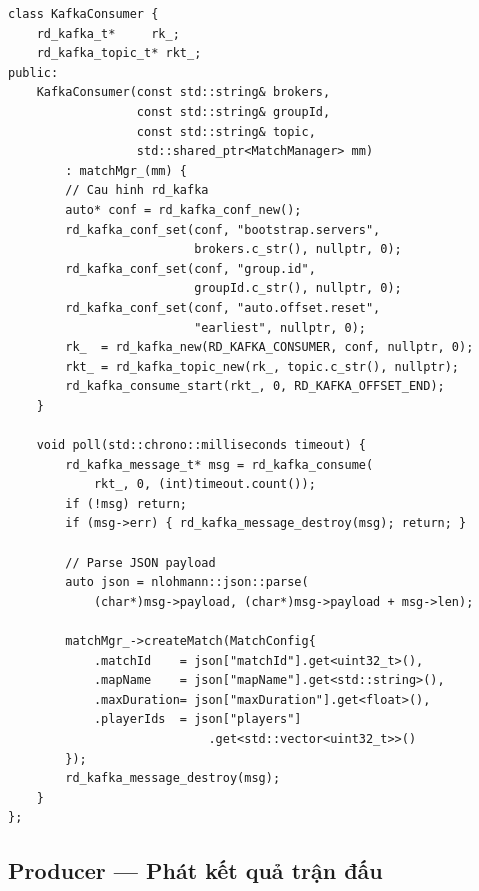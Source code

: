 \documentclass[12pt,a4paper]{report}
\begin{document}
\begin{lstlisting}[style=cppStyle, caption={Kafka Consumer: tiêu thụ match.create}, label={lst:kafkaconsumer}]
class KafkaConsumer {
    rd_kafka_t*     rk_;
    rd_kafka_topic_t* rkt_;
public:
    KafkaConsumer(const std::string& brokers,
                  const std::string& groupId,
                  const std::string& topic,
                  std::shared_ptr<MatchManager> mm)
        : matchMgr_(mm) {
        // Cau hinh rd_kafka
        auto* conf = rd_kafka_conf_new();
        rd_kafka_conf_set(conf, "bootstrap.servers",
                          brokers.c_str(), nullptr, 0);
        rd_kafka_conf_set(conf, "group.id",
                          groupId.c_str(), nullptr, 0);
        rd_kafka_conf_set(conf, "auto.offset.reset",
                          "earliest", nullptr, 0);
        rk_  = rd_kafka_new(RD_KAFKA_CONSUMER, conf, nullptr, 0);
        rkt_ = rd_kafka_topic_new(rk_, topic.c_str(), nullptr);
        rd_kafka_consume_start(rkt_, 0, RD_KAFKA_OFFSET_END);
    }

    void poll(std::chrono::milliseconds timeout) {
        rd_kafka_message_t* msg = rd_kafka_consume(
            rkt_, 0, (int)timeout.count());
        if (!msg) return;
        if (msg->err) { rd_kafka_message_destroy(msg); return; }

        // Parse JSON payload
        auto json = nlohmann::json::parse(
            (char*)msg->payload, (char*)msg->payload + msg->len);

        matchMgr_->createMatch(MatchConfig{
            .matchId    = json["matchId"].get<uint32_t>(),
            .mapName    = json["mapName"].get<std::string>(),
            .maxDuration= json["maxDuration"].get<float>(),
            .playerIds  = json["players"]
                            .get<std::vector<uint32_t>>()
        });
        rd_kafka_message_destroy(msg);
    }
};
\end{lstlisting}

\subsection{Producer --- Phát kết quả trận đấu}
\end{document}
